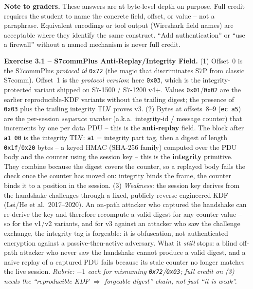 \documentclass[11pt,a4paper]{article}
\begin{document}
\sheetheader

\noindent\textbf{Note to graders.}
These answers are at byte-level depth on purpose. Full credit requires the
student to name the concrete field, offset, or value -- not a paraphrase.
Equivalent encodings or tool output (Wireshark field names) are acceptable
where they identify the same construct. ``Add authentication'' or ``use a
firewall'' without a named mechanism is never full credit.

\vspace{0.4em}

\begin{solutionbox}
\textbf{Exercise 3.1 -- S7commPlus Anti-Replay/Integrity Field.}
(1) Offset~0 is the S7commPlus \emph{protocol id} \texttt{0x72} (the magic
that discriminates S7P from classic S7comm). Offset~1 is the \emph{protocol
version}: here \texttt{0x03}, which is the integrity-protected variant
shipped on S7-1500 / S7-1200 v4+. Values \texttt{0x01}/\texttt{0x02} are the
earlier reproducible-KDF variants without the trailing digest; the presence
of \texttt{0x03} plus the trailing integrity TLV proves v3.
(2) Bytes at offsets~8--9 (\texttt{ec a5}) are the per-session
\emph{sequence number} (a.k.a.\ integrity-id / message counter) that
increments by one per data PDU -- this is the \textbf{anti-replay} field. The
block after \texttt{a1 00} is the integrity TLV: \texttt{a1} = integrity
part tag, then a digest of length \texttt{0x1f}/\texttt{0x20} bytes -- a
keyed HMAC (SHA-256 family) computed over the PDU body and the counter using
the session key -- this is the \textbf{integrity} primitive. They combine
because the digest covers the counter, so a replayed body fails the check
once the counter has moved on: integrity binds the frame, the counter binds
it to a position in the session.
(3) \emph{Weakness:} the session key derives from the handshake challenges
through a fixed, publicly reverse-engineered KDF (Lei/He et al.\
2017--2020). An on-path attacker who captured the handshake can re-derive
the key and therefore recompute a valid digest for any counter value -- so
for the v1/v2 variants, and for v3 against an attacker who saw the
challenge exchange, the integrity tag is forgeable: it is obfuscation, not
authenticated encryption against a passive-then-active adversary. What it
\emph{still} stops: a blind off-path attacker who never saw the handshake
cannot produce a valid digest, and a naive replay of a captured PDU fails
because its stale counter no longer matches the live session.
\textit{Rubric: $-1$ each for misnaming \texttt{0x72}/\texttt{0x03}; full
credit on (3) needs the ``reproducible KDF $\Rightarrow$ forgeable digest''
chain, not just ``it is weak''.}
\end{solutionbox}
\end{document}

